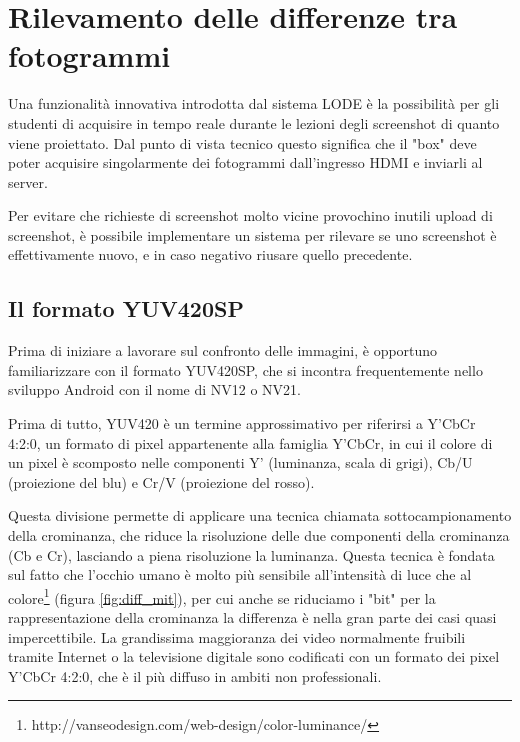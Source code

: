 \chapter{Rilevamento delle differenze tra fotogrammi}
\label{cha:diff}

Una funzionalità innovativa introdotta dal sistema LODE è la possibilità per gli studenti di acquisire in tempo reale durante le lezioni degli screenshot di quanto viene proiettato. Dal punto di vista tecnico questo significa che il "box" deve poter acquisire singolarmente dei fotogrammi dall'ingresso HDMI e inviarli al server.

Per evitare che richieste di screenshot molto vicine provochino inutili upload di screenshot, è possibile implementare un sistema per rilevare se uno screenshot è effettivamente nuovo, e in caso negativo riusare quello precedente.

\section{Il formato YUV420SP}
\label{sec:diff_yuv}

Prima di iniziare a lavorare sul confronto delle immagini, è opportuno familiarizzare con il formato YUV420SP, che si incontra frequentemente nello sviluppo Android con il nome di NV12 o NV21.

Prima di tutto, YUV420 è un termine approssimativo per riferirsi a Y'CbCr 4:2:0, un formato di pixel appartenente alla famiglia Y'CbCr, in cui il colore di un pixel è scomposto nelle componenti Y' (luminanza, scala di grigi\footnotemark{}), Cb/U (proiezione del blu) e Cr/V (proiezione del rosso).


Questa divisione permette di applicare una tecnica chiamata sottocampionamento della crominanza, che riduce la risoluzione delle due componenti della crominanza (Cb e Cr), lasciando a piena risoluzione la luminanza.\cite{yuv} Questa tecnica è fondata sul fatto che l'occhio umano è molto più sensibile all'intensità di luce che al colore\footnote{http://vanseodesign.com/web-design/color-luminance/} (figura \ref{fig:diff_mit}), per cui anche se riduciamo i "bit" per la rappresentazione della crominanza la differenza è nella gran parte dei casi quasi impercettibile. La grandissima maggioranza dei video normalmente fruibili tramite Internet o la televisione digitale sono codificati con un formato dei pixel Y'CbCr 4:2:0, che è il più diffuso in ambiti non professionali.

